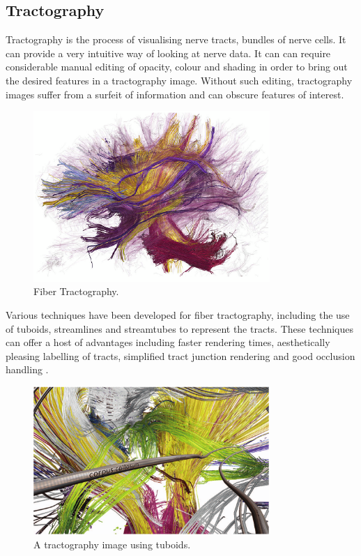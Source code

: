 \documentclass[MSc,paper=a4,pagesize=auto]{icldt}
\begin{document}
\subsection{Tractography}
Tractography is the process of visualising nerve tracts, bundles of nerve cells. It can provide a very intuitive way of looking at nerve data. It can can require considerable manual editing of opacity, colour and shading in order to bring out the desired features in a tractography image. Without such editing, tractography images suffer from a surfeit of information and can obscure features of interest.

\begin{figure}[htbp!]
    \centering
    \includegraphics[width=0.8\textwidth]{resources/tractography}
    \caption{Fiber Tractography. \cite{Odonnell2006}}
    \label{fig:tractography}
\end{figure}

Various techniques have been developed for fiber tractography, including the use of tuboids, streamlines and streamtubes to represent the tracts. These techniques can offer a host of advantages including faster rendering times, aesthetically pleasing labelling of tracts, simplified tract junction rendering and good occlusion handling \cite{Petrovic2007}.

\begin{figure}[htbp!]
    \centering
    \includegraphics[width=0.8\textwidth]{resources/tuboids}
    \caption{A tractography image using tuboids. \cite{Petrovic2007}}
    \label{fig:tuboids}
\end{figure}
\end{document}
